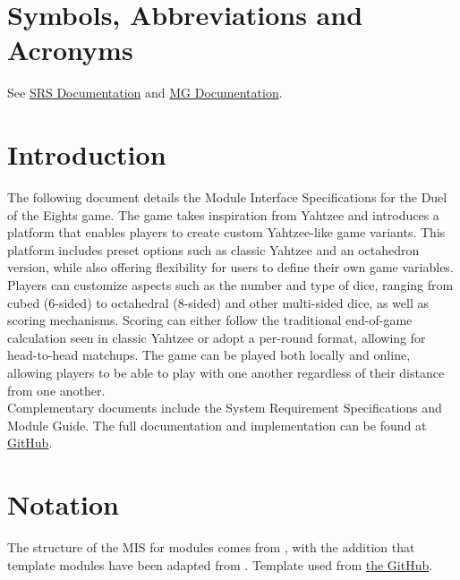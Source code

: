 \documentclass[12pt, titlepage]{article}
\begin{document}
\section{Symbols, Abbreviations and Acronyms}

See \href{https://github.com/John-Popovici/duel-of-the-eights/blob/main/docs/SRS/SRS.pdf}{SRS Documentation} and \href{https://github.com/John-Popovici/duel-of-the-eights/blob/main/docs/Design/SoftArchitecture/MG.pdf}{MG Documentation}.


\section{Introduction}

The following document details the Module Interface Specifications for the Duel of the Eights game. The game takes inspiration from Yahtzee and introduces a platform that enables players to create custom Yahtzee-like game variants. This platform includes preset options such as classic Yahtzee and an octahedron version, while also offering flexibility for users to define their own game variables. Players can customize aspects such as the number and type of dice, ranging from cubed (6-sided) to octahedral (8-sided) and other multi-sided dice, as well as scoring mechanisms. Scoring can either follow the traditional end-of-game calculation seen in classic Yahtzee or adopt a per-round format, allowing for head-to-head matchups. The game can be played both locally and online, allowing players to be able to play with one another regardless of their distance from one another.\\

Complementary documents include the System Requirement Specifications
and Module Guide.  The full documentation and implementation can be
found at \href{https://github.com/John-Popovici/duel-of-the-eights/tree/main}{GitHub}.

\newpage
\section{Notation}


The structure of the MIS for modules comes from \citet{HoffmanAndStrooper1995},
with the addition that template modules have been adapted from
\cite{GhezziEtAl2003}. Template used from \href{https://github.com/smiths/capTemplate}{the \progname GitHub}.\\
\end{document}
